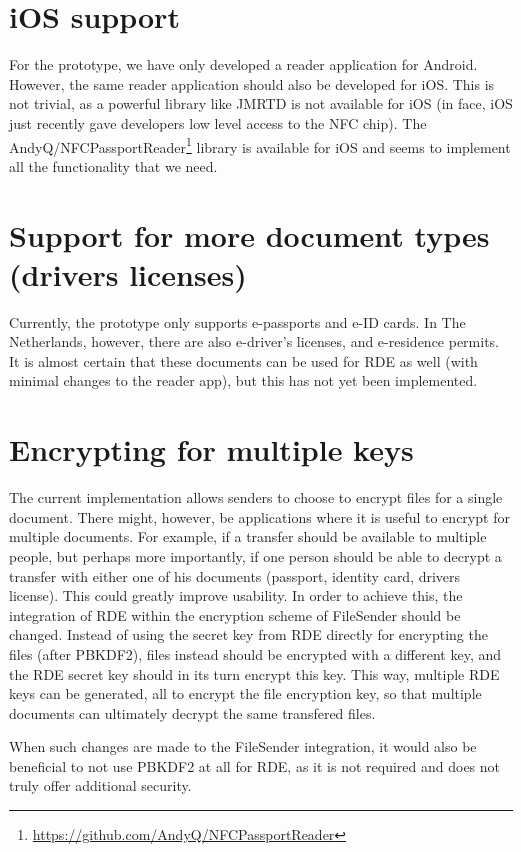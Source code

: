 \section{iOS support}
\label{sec:ios-support}
For the prototype, we have only developed a reader application for Android.
However, the same reader application should also be developed for iOS.
This is not trivial, as a powerful library like JMRTD is not available for iOS (in face, iOS just recently gave developers low level access to the NFC chip).
The \textsf{AndyQ/NFCPassportReader}\footnote{\url{https://github.com/AndyQ/NFCPassportReader}} library is available for iOS and seems to implement all the functionality that we need.

\section{Support for more document types (drivers licenses)}
\label{sec:support-for-more-document-types}
Currently, the prototype only supports e-passports and e-ID cards.
In The Netherlands, however, there are also e-driver's licenses, and e-residence permits.
It is almost certain that these documents can be used for RDE as well (with minimal changes to the reader app), but this has not yet been implemented.

\section{Encrypting for multiple keys}
\label{sec:encrypting-for-multiple-keys}
The current implementation allows senders to choose to encrypt files for a single document.
There might, however, be applications where it is useful to encrypt for multiple documents. 
For example, if a transfer should be available to multiple people, but perhaps more importantly, if one person should be able to decrypt a transfer with either one of his documents (passport, identity card, drivers license).
This could greatly improve usability. 
In order to achieve this, the integration of RDE within the encryption scheme of FileSender should be changed.
Instead of using the secret key from RDE directly for encrypting the files (after PBKDF2), files instead should be encrypted with a different key, and the RDE secret key should in its turn encrypt this key.
This way, multiple RDE keys can be generated, all to encrypt the file encryption key, so that multiple documents can ultimately decrypt the same transfered files.

When such changes are made to the FileSender integration, it would also be beneficial to not use PBKDF2 at all for RDE, as it is not required and does not truly offer additional security.


